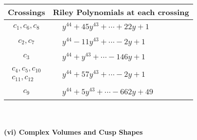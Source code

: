 \documentclass[1p]{elsarticle_modified}
\theoremstyle{definition}
\begin{document}
\begin{tabular}{m{50pt}|m{274pt}}
Crossings & \hspace{64pt}Riley Polynomials at each crossing \\
\hline $$\begin{aligned}c_{1},c_{6},c_{8}\end{aligned}$$&$\begin{aligned}
&y^{44}+45 y^{43}+\cdots+22 y+1
\end{aligned}$\\
\hline $$\begin{aligned}c_{2},c_{7}\end{aligned}$$&$\begin{aligned}
&y^{44}-11 y^{43}+\cdots-2 y+1
\end{aligned}$\\
\hline $$\begin{aligned}c_{3}\end{aligned}$$&$\begin{aligned}
&y^{44}+y^{43}+\cdots-146 y+1
\end{aligned}$\\
\hline $$\begin{aligned}c_{4},c_{5},c_{10}\\c_{11},c_{12}\end{aligned}$$&$\begin{aligned}
&y^{44}+57 y^{43}+\cdots-2 y+1
\end{aligned}$\\
\hline $$\begin{aligned}c_{9}\end{aligned}$$&$\begin{aligned}
&y^{44}+5 y^{43}+\cdots-662 y+49
\end{aligned}$\\
\hline
\end{tabular}\\~\\
\newpage\flushleft \textbf{(vi) Complex Volumes and Cusp Shapes}
\end{document}
